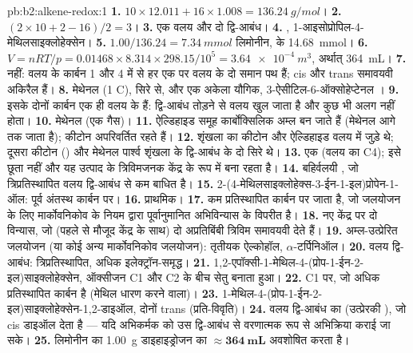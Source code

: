 \begin{solution}{pb:b2:alkene-redox:1}
\textbf{1.} $10 \times 12.011 + 16 \times 1.008 = \qty{136.24}{g/mol}$।
\textbf{2.} $(2 \times 10 + 2 - 16)/2 = 3$।
\textbf{3.} एक वलय और दो द्वि-आबंध।
\textbf{4.} , 1-आइसोप्रोपिल-4-मेथिलसाइक्लोहेक्सेन।
\textbf{5.} $1.00/136.24 = \qty{7.34}{mmol}$ लिमोनीन,  के \qty{14.68}{mmol}।
\textbf{6.} $V = nRT/p = 0.01468 \times 8.314 \times 298.15/10^5 = \qty{3.64e-4}{m^3}$,
अर्थात् \qty{364}{mL}।
\textbf{7.} नहीं: वलय के कार्बन 1 और 4 में से हर एक पर वलय के दो समान पथ हैं; cis और
trans समावयवी अकिरैल हैं।
\textbf{8.} मेथेनल  (1 C),  सिरे से, और एक अकेला  यौगिक,
3-ऐसीटिल-6-ऑक्सोहेप्टेनल ।
\textbf{9.} इसके दोनों कार्बन एक ही वलय के हैं: द्वि-आबंध तोड़ने से वलय खुल जाता है
और कुछ भी अलग नहीं होता।
\textbf{10.} मेथेनल (एक गैस)।
\textbf{11.} ऐल्डिहाइड समूह कार्बोक्सिलिक अम्ल बन जाते हैं (मेथेनल आगे  तक जाता है);
कीटोन अपरिवर्तित रहते हैं।
\textbf{12.}  शृंखला का कीटोन और ऐल्डिहाइड वलय में जुड़े थे; दूसरा
कीटोन () और मेथेनल पार्श्व शृंखला के द्वि-आबंध के दो सिरे थे।
\textbf{13.} एक (वलय का C4);  इसे छूता नहीं और यह  उत्पाद के
त्रिविमजनक केंद्र के रूप में बना रहता है।
\textbf{14.} बहिर्वलयी , जो त्रिप्रतिस्थापित वलय द्वि-आबंध से कम बाधित है।
\textbf{15.} 2-(4-मेथिलसाइक्लोहेक्स-3-ईन-1-इल)प्रोपेन-1-ऑल:  पूर्व अंतस्थ
कार्बन पर।
\textbf{16.} प्राथमिक।
\textbf{17.}  कम प्रतिस्थापित कार्बन पर जाता है, जो जलयोजन के लिए मार्कोवनिकोव के नियम द्वारा
पूर्वानुमानित अभिविन्यास के विपरीत है।
\textbf{18.} नए केंद्र पर दो विन्यास, जो (पहले से मौजूद केंद्र के साथ) दो
अप्रतिबिंबी त्रिविम समावयवी देते हैं।
\textbf{19.} अम्ल-उत्प्रेरित जलयोजन (या कोई अन्य मार्कोवनिकोव जलयोजन): तृतीयक ऐल्कोहॉल,
$\alpha$-टर्पिनिऑल।
\textbf{20.} वलय द्वि-आबंध: त्रिप्रतिस्थापित, अधिक इलेक्ट्रॉन-समृद्ध।
\textbf{21.} 1,2-एपॉक्सी-1-मेथिल-4-(प्रोप-1-ईन-2-इल)साइक्लोहेक्सेन, ऑक्सीजन C1 और C2 के बीच सेतु बनाता हुआ।
\textbf{22.} C1 पर, जो अधिक प्रतिस्थापित कार्बन है (मेथिल धारण करने वाला)।
\textbf{23.} 1-मेथिल-4-(प्रोप-1-ईन-2-इल)साइक्लोहेक्सेन-1,2-डाइऑल, दोनों  trans (प्रति-विवृति)।
\textbf{24.} वलय द्वि-आबंध का  (उत्प्रेरकी ), जो cis
डाइऑल देता है --- यदि अभिकर्मक को उस द्वि-आबंध से वरणात्मक रूप से अभिक्रिया कराई जा सके।
\textbf{25.} लिमोनीन का \qty{1.00}{g} डाइहाइड्रोजन का $\boldsymbol{\approx \qty{364}{mL}}$
अवशोषित करता है।
\end{solution}
